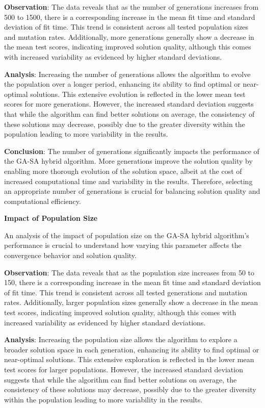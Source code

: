 \documentclass[
]{article}
\begin{document}
    \textbf{Observation}: The data reveals that as the number of generations increases from 500 to 1500, there is a corresponding increase in the mean fit time and standard deviation of fit time. This trend is consistent across all tested population sizes and mutation rates. Additionally, more generations generally show a decrease in the mean test scores, indicating improved solution quality, although this comes with increased variability as evidenced by higher standard deviations.

    \textbf{Analysis}: Increasing the number of generations allows the algorithm to evolve the population over a longer period, enhancing its ability to find optimal or near-optimal solutions. This extensive evolution is reflected in the lower mean test scores for more generations. However, the increased standard deviation suggests that while the algorithm can find better solutions on average, the consistency of these solutions may decrease, possibly due to the greater diversity within the population leading to more variability in the results.

    \textbf{Conclusion}: The number of generations significantly impacts the performance of the GA-SA hybrid algorithm. More generations improve the solution quality by enabling more thorough evolution of the solution space, albeit at the cost of increased computational time and variability in the results. Therefore, selecting an appropriate number of generations is crucial for balancing solution quality and computational efficiency.

    \textbf{Impact of Population Size}

    An analysis of the impact of population size on the GA-SA hybrid algorithm’s performance is crucial to understand how varying this parameter affects the convergence behavior and solution quality.

    \textbf{Observation}: The data reveals that as the population size increases from 50 to 150, there is a corresponding increase in the mean fit time and standard deviation of fit time. This trend is consistent across all tested generations and mutation rates. Additionally, larger population sizes generally show a decrease in the mean test scores, indicating improved solution quality, although this comes with increased variability as evidenced by higher standard deviations.

    \textbf{Analysis}: Increasing the population size allows the algorithm to explore a broader solution space in each generation, enhancing its ability to find optimal or near-optimal solutions. This extensive exploration is reflected in the lower mean test scores for larger populations. However, the increased standard deviation suggests that while the algorithm can find better solutions on average, the consistency of these solutions may decrease, possibly due to the greater diversity within the population leading to more variability in the results.
\end{document}
